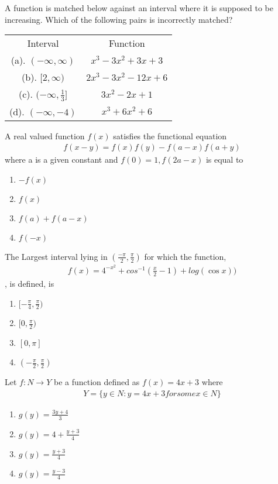 \item A function is matched below against an interval where it is supposed to be increasing. Which of the following pairs is incorrectly matched?
\begin{table}[h!]
\centering
\begin{tabular}{c c} 
 Interval & Function\\ [0.5ex] 
 (a). $(-\infty,\infty)$ & $x^3-3x^2+3x+3$\\ 
 (b). $[2,\infty)$ & $2x^3-3x^2-12x+6$\\
 (c). $(-\infty,\frac{1}{3}]$ & $3x^2-2x+1$\\
 (d). $(-\infty,-4)$ & $x^3+6x^2+6$\\[1ex] 
\end{tabular}
\end{table}

\item A real valued function $f(x)$ satisfies the functional equation 
\begin{align*}
f(x-y)=f(x)f(y)-f(a-x)f(a+y)
\end{align*} 
where a is a given constant and $f(0)=1, f(2a-x)$ is equal to 
\begin{enumerate}
\item $-f(x)$
\item $f(x)$
\item $f(a)+f(a-x)$
\item $f(-x)$
\end{enumerate}

\item The Largest interval lying in $(\frac{-\pi}{2},\frac{\pi}{2})$ for which the function, 
\begin{align*}
f(x)=4^{-x^2}+cos^{-1}(\frac{x}{2}-1)+log(\cos x))
\end{align*},
is defined, is
\begin{enumerate}
\item $[-\frac{\pi}{4},\frac{\pi}{2})$
\item $[0,\frac{\pi}{2})$
\item $[0,\pi]$
\item $(-\frac{\pi}{2},\frac{\pi}{2})$
\end{enumerate} 

\item Let $f: N \rightarrow Y$ be a function defined as $f(x)=4x+3$ where
\begin{align*}
Y=\{ y \in N:y=4x+3 for some x \in N\}
\end{align*}
\begin{enumerate}
\item $g(y)=\frac{3y+4}{3}$
\item $g(y)=4+\frac{y+3}{4}$
\item $g(y)=\frac{y+3}{4}$
\item $g(y)=\frac{y-3}{4}$
\end{enumerate}

